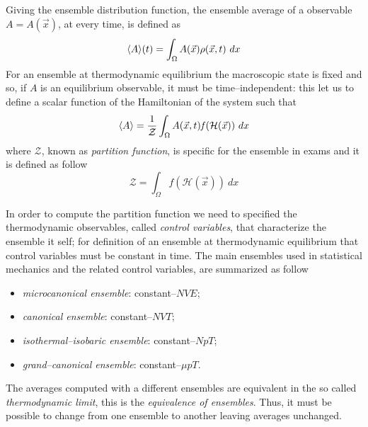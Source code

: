 Giving the ensemble distribution function, the ensemble average of a observable $A=A(\vec x)$, at every time, is defined as
\begin{equation*}
	\langle A \rangle(t) = \int_\Omega A(\vec x)\rho(\vec x, t)\ dx
\end{equation*}
For an ensemble at thermodynamic equilibrium the macroscopic state is fixed and so, if $A$ is an equilibrium observable, it must be time--independent: this let us to define a scalar function of the Hamiltonian of the system such that
\begin{equation*}
	\langle A \rangle = \frac{1}{\mathcal{Z}} \int_\Omega A(\vec x, t) \mathit{f}(\mathcal{H}(\vec x))\ dx
\end{equation*}
where $\mathcal{Z}$, known as \textit{partition function}, is specific for the ensemble in exams and it is defined as follow
\begin{equation*}
	\mathcal{Z} = \int_\Omega \mathit{f}(\mathcal{H}(\vec x))\ dx
\end{equation*}

In order to compute the partition function we need to specified the thermodynamic observables, called \textit{control variables}, that characterize the ensemble it self; for definition of an ensemble at thermodynamic equilibrium that control variables must be constant in time. The main ensembles used in statistical mechanics and the related control variables, are summarized as follow
\begin{itemize}
	\item \textit{microcanonical ensemble}: constant--$NVE$; %
	\item \textit{canonical ensemble}: constant--$NVT$; %
	\item \textit{isothermal--isobaric ensemble}: constant--$NpT$; %
	\item \textit{grand--canonical ensemble}: constant--$\mu pT$.%
\end{itemize}
The averages computed with a different ensembles are equivalent in the so called \textit{thermodynamic limit}, this is the \textit{equivalence of ensembles}. Thus, it must be possible to change from one ensemble to another leaving averages unchanged.


